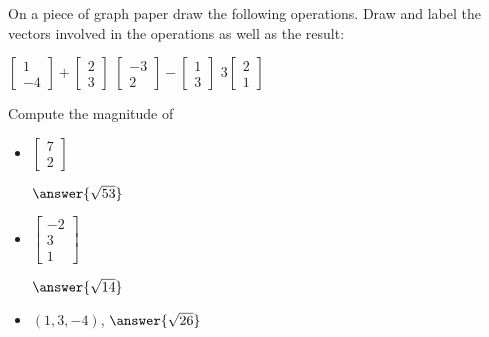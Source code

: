 \documentclass{ximera}
\begin{document}
\begin{exercise}
    On a piece of graph paper draw the following operations.  Draw and label the vectors involved in the operations as well as the result:
    \begin{tasks}
        \task
        $\begin{bmatrix}
            1 \\
            -4
        \end{bmatrix}
        +
        \begin{bmatrix}
            2 \\
            3
        \end{bmatrix}$
        \task
        $\begin{bmatrix}
            -3 \\
            2
        \end{bmatrix}
        -
        \begin{bmatrix}
            1 \\
            3
        \end{bmatrix}$
        \task
        $3\begin{bmatrix}
            2 \\
            1
        \end{bmatrix}$
    \end{tasks}
\end{exercise}

\begin{exercise}
    Compute the magnitude of
    \begin{itemize}
        \item
        $\begin{bmatrix}
            7 \\
            2 
        \end{bmatrix}$
        
        $\answer{\sqrt{53}}$
        \item
        $\begin{bmatrix}
            -2 \\
            3 \\
            1
        \end{bmatrix}$
                
        $\answer{\sqrt{14}}$
        \item $(1,3,-4)$, $\answer{\sqrt{26}}$
    \end{itemize}
\end{exercise}
\end{document}
